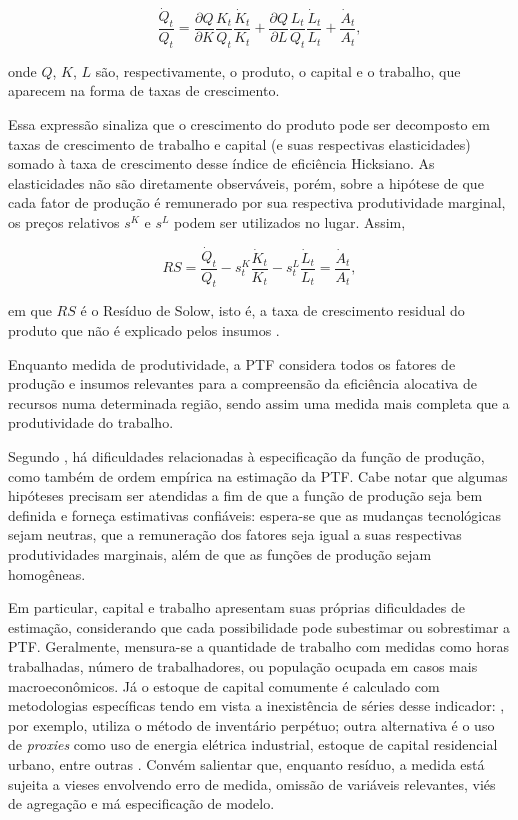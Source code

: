 \documentclass[
  12pt,
  a4paper,
  oneside,
  brazil,
  chapter=TITLE,
  section=TITLE
]{abntex2}
\begin{document}
\begin{equation}
  \frac{\dot{Q}_t}{Q_t} = \frac{\partial Q}{\partial K}\frac{K_t}{Q_t}\frac{\dot{K}_t}{K_t} + \frac{\partial Q}{\partial L}\frac{L_t}{Q_t}\frac{\dot{L}_t}{L_t} + \frac{\dot{A}_t}{A_t},
  \label{eq:solow_diff}
\end{equation}

\noindent onde $Q$, $K$, $L$ são, respectivamente, o produto, o capital e o trabalho, que aparecem na forma de taxas de crescimento.

Essa expressão sinaliza que o crescimento do produto pode ser decomposto em taxas de crescimento de trabalho e capital (e suas respectivas elasticidades) somado à taxa de crescimento desse índice de eficiência Hicksiano. As elasticidades não são diretamente observáveis, porém, sobre a hipótese de que cada fator de produção é remunerado por sua respectiva produtividade marginal, os preços relativos $s^K$ e $s^L$ podem ser utilizados no lugar. Assim,

\begin{equation}
  RS = \frac{\dot{Q}_t}{Q_t} - s_t^K \frac{\dot{K}_t}{K_t} - s_t^L \frac{\dot{L}_t}{L_t} = \frac{\dot{A}_t}{A_t},
  \label{eq:residuo_solow}
\end{equation}

\noindent em que $RS$ é o Resíduo de Solow, isto é, a taxa de crescimento residual do produto que não é explicado pelos insumos \cite{hulten2001}.

Enquanto medida de produtividade, a PTF considera todos os fatores de produção e insumos relevantes para a compreensão da eficiência alocativa de recursos numa determinada região, sendo assim uma medida mais completa que a produtividade do trabalho.

Segundo , há dificuldades relacionadas à especificação da função de produção, como também de ordem empírica na estimação da PTF. Cabe notar que algumas hipóteses precisam ser atendidas a fim de que a função de produção seja bem definida e forneça estimativas confiáveis: espera-se que as mudanças tecnológicas sejam neutras, que a remuneração dos fatores seja igual a suas respectivas produtividades marginais, além de que as funções de produção sejam homogêneas.

Em particular, capital e trabalho apresentam suas próprias dificuldades de estimação, considerando que cada possibilidade pode subestimar ou sobrestimar a PTF. Geralmente, mensura-se a quantidade de trabalho com medidas como horas trabalhadas, número de trabalhadores, ou população ocupada em casos mais macroeconômicos. Já o estoque de capital comumente é calculado com metodologias específicas tendo em vista a inexistência de séries desse indicador: , por exemplo, utiliza o método de inventário perpétuo; outra alternativa é o uso de \textit{proxies} como uso de energia elétrica industrial, estoque de capital residencial urbano, entre outras \cite{firme2014}. Convém salientar que, enquanto resíduo, a medida está sujeita a vieses envolvendo erro de medida, omissão de variáveis relevantes, viés de agregação e má especificação de modelo.
\end{document}
